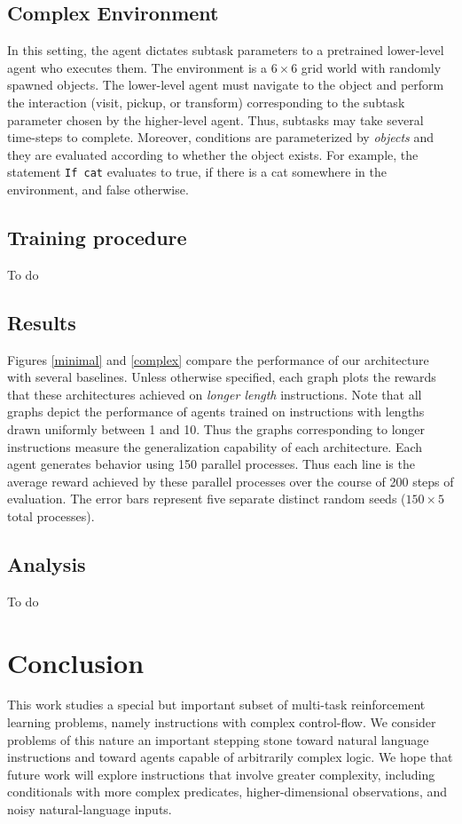 \documentclass{article}
\begin{document}
\subsection{Complex Environment}
In this setting, the agent dictates subtask parameters to a pretrained
lower-level agent who executes them. The environment is a $6\times 6$ grid world
with randomly spawned objects. The lower-level agent must navigate to the object
and perform the interaction (visit, pickup, or transform) corresponding to the
subtask parameter chosen by the higher-level agent. Thus, subtasks may take several time-steps to
complete. Moreover, conditions are parameterized by \textit{objects} and they
are evaluated according to whether the object exists. For example, the statement
\texttt{If cat} evaluates to true, if there is a cat somewhere in the
environment, and false otherwise.


\subsection{Training procedure}
To do
 
\subsection{Results}
\label{results}
Figures \ref{minimal} and \ref{complex} compare the performance of our
architecture with several baselines. 
Unless otherwise specified, each graph plots the rewards that these architectures achieved on \textit{longer
length} instructions.
 Note that all graphs depict the performance of agents trained on instructions with lengths drawn uniformly between 1 and 10. Thus
the graphs corresponding to longer instructions measure the generalization
capability of each architecture. Each agent generates behavior using 150
parallel processes. Thus each
line is the average reward achieved by these parallel processes over the course of
200 steps of evaluation. The error bars represent five separate distinct random
seeds ($150 \times 5$ total processes).

\subsection{Analysis}
To do

\section{Conclusion}
This work studies a special but important subset of multi-task reinforcement
learning problems, namely instructions with complex control-flow. We consider
problems of this nature an important stepping stone toward natural language
instructions and toward agents capable of arbitrarily complex logic. We hope
that future work will explore instructions that involve greater complexity,
including conditionals with more complex predicates, higher-dimensional
observations, and noisy natural-language inputs.
\end{document}
